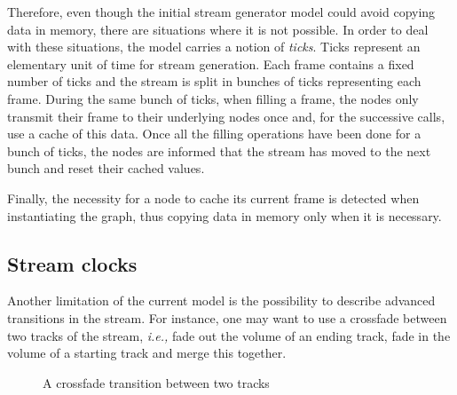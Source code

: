 \documentclass{llncs}
\newcommand{\ie}{{\em i.e.,}}
\begin{document}
Therefore, even though the initial stream generator model could avoid copying data in memory, there 
are situations where it is not possible. In order to deal with these situations, the 
model carries a notion of \textit{ticks}. Ticks represent an elementary unit of time
for stream generation. Each frame contains a fixed number of ticks and the stream is split
in bunches of ticks representing each frame. During the same bunch of ticks, when filling a frame, the nodes only 
transmit their frame to their underlying nodes once and, for the successive calls, use a cache of this data. 
Once all the filling operations have been done for a bunch of ticks, the nodes are informed that the 
stream has moved to the next bunch and reset their cached values. 

Finally, the necessity for a node to cache its current frame is detected when instantiating the graph, thus
copying data in memory only when it is necessary.

\subsection*{Stream clocks}


Another limitation of the current model is the possibility to describe advanced transitions in 
the stream. For instance, one may want to use a crossfade between two tracks 
of the stream, \ie{}
fade out the volume of an ending track, fade in the volume of a starting track and merge this together.

\begin{figure}[htn]
 \begin{center}
\end{center}
 \caption{A crossfade transition between two tracks}
 \label{cross-fig}
\end{figure}
\end{document}
